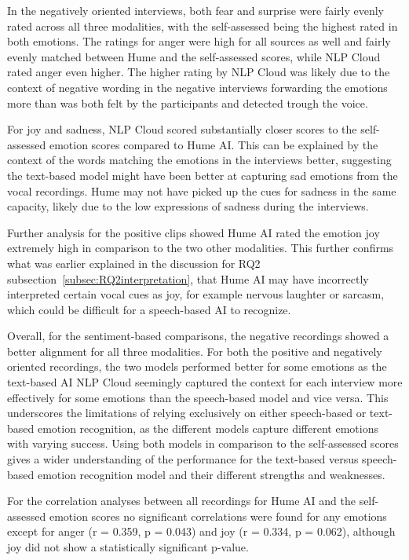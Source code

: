 In the negatively oriented interviews, both fear and surprise were fairly evenly rated across all three modalities, with the self-assessed being the highest rated in both emotions.
The ratings for anger were high for all sources as well and fairly evenly matched between Hume and the self-assessed scores, while NLP Cloud rated anger even higher. The higher rating by NLP Cloud was likely due to the context of negative wording in the negative interviews forwarding the emotions more than was both felt by the participants and detected trough the voice.

For joy and sadness, NLP Cloud scored substantially closer scores to the self-assessed emotion scores compared to Hume AI. This can be explained by the context of the words matching the emotions in the interviews better, suggesting the text-based model might have been better at capturing sad emotions from the vocal recordings. Hume may not have picked up the cues for sadness in the same capacity, likely due to the low expressions of sadness during the interviews.

Further analysis for the positive clips showed Hume AI rated the emotion joy extremely high in comparison to the two other modalities. This further confirms what was earlier explained in the discussion for RQ2 subsection~\ref{subsec:RQ2interpretation}, that Hume AI may have incorrectly interpreted certain vocal cues as joy, for example nervous laughter or sarcasm, which could be difficult for a speech-based AI to recognize.

Overall, for the sentiment-based comparisons, the negative recordings showed a better alignment for all three modalities. For both the positive and negatively oriented recordings, the two models performed better for some emotions as the text-based AI NLP Cloud seemingly captured the context for each interview more effectively for some emotions than the speech-based model and vice versa. This underscores the limitations of relying exclusively on either speech-based or text-based emotion recognition, as the different models capture different emotions with varying success. Using both models in comparison to the self-assessed scores gives a wider understanding of the performance for the text-based versus speech-based emotion recognition model and their different strengths and weaknesses.

For the correlation analyses between all recordings for Hume AI and the self-assessed emotion scores no significant correlations were found for any emotions except for anger (r = 0.359, p = 0.043) and joy (r = 0.334, p = 0.062), although joy did not show a statistically significant p-value. 

